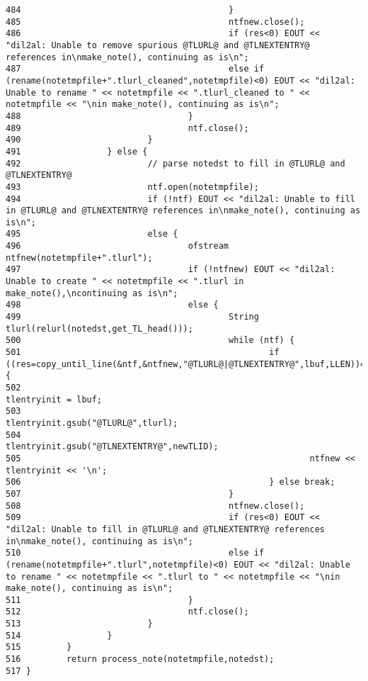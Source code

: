 \begin{verbatim}
484                                         }
485                                         ntfnew.close();
486                                         if (res<0) EOUT << "dil2al: Unable to remove spurious @TLURL@ and @TLNEXTENTRY@ references in\nmake_note(), continuing as is\n";
487                                         else if (rename(notetmpfile+".tlurl_cleaned",notetmpfile)<0) EOUT << "dil2al: Unable to rename " << notetmpfile << ".tlurl_cleaned to " << notetmpfile << "\nin make_note(), continuing as is\n";
488                                 }
489                                 ntf.close();
490                         }
491                 } else {
492                         // parse notedst to fill in @TLURL@ and @TLNEXTENTRY@
493                         ntf.open(notetmpfile);
494                         if (!ntf) EOUT << "dil2al: Unable to fill in @TLURL@ and @TLNEXTENTRY@ references in\nmake_note(), continuing as is\n";
495                         else {
496                                 ofstream ntfnew(notetmpfile+".tlurl");
497                                 if (!ntfnew) EOUT << "dil2al: Unable to create " << notetmpfile << ".tlurl in make_note(),\ncontinuing as is\n";
498                                 else {
499                                         String tlurl(relurl(notedst,get_TL_head()));
500                                         while (ntf) {
501                                                 if ((res=copy_until_line(&ntf,&ntfnew,"@TLURL@|@TLNEXTENTRY@",lbuf,LLEN))==1) {
502                                                         tlentryinit = lbuf;
503                                                         tlentryinit.gsub("@TLURL@",tlurl);
504                                                         tlentryinit.gsub("@TLNEXTENTRY@",newTLID);
505                                                         ntfnew << tlentryinit << '\n';
506                                                 } else break;
507                                         }
508                                         ntfnew.close();
509                                         if (res<0) EOUT << "dil2al: Unable to fill in @TLURL@ and @TLNEXTENTRY@ references in\nmake_note(), continuing as is\n";
510                                         else if (rename(notetmpfile+".tlurl",notetmpfile)<0) EOUT << "dil2al: Unable to rename " << notetmpfile << ".tlurl to " << notetmpfile << "\nin make_note(), continuing as is\n";
511                                 }
512                                 ntf.close();
513                         }
514                 }
515         }
516         return process_note(notetmpfile,notedst);
517 }
\end{verbatim}\normalsize 
{}
